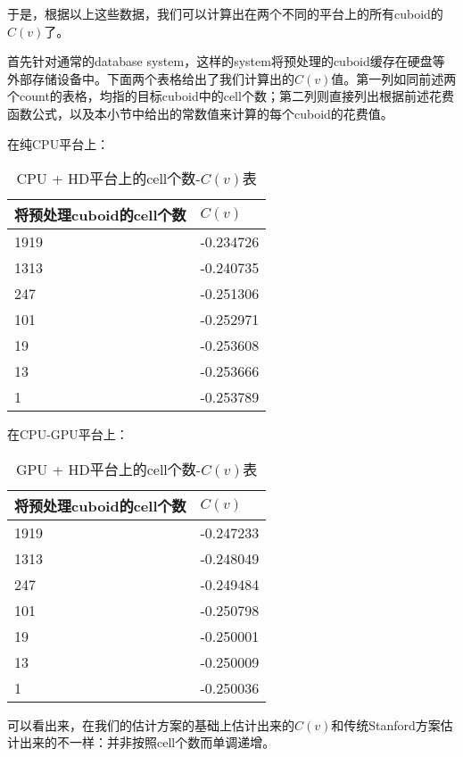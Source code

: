 于是，根据以上这些数据，我们可以计算出在两个不同的平台上的所有cuboid的$C(v)$了。

首先针对通常的database system，这样的system将预处理的cuboid缓存在硬盘等外部存储设备中。下面两个表格给出了我们计算出的$C(v)$值。第一列如同前述两个count的表格，均指的目标cuboid中的cell个数；第二列则直接列出根据前述花费函数公式，以及本小节中给出的常数值来计算的每个cuboid的花费值。

在纯CPU平台上：

\begin{table}[!htbp]
\centering
\caption{CPU + HD平台上的cell个数-$C(v)$表} 
\label{tab:table13}
\begin{tabular}{|l|l|}
    \hline
    将预处理cuboid的cell个数 & $C(v)$\\
    \hline
    1919 & -0.234726\\
    \hline
    1313 & -0.240735\\
    \hline
    247 & -0.251306\\
    \hline
    101 & -0.252971\\
    \hline
    19 & -0.253608\\
    \hline
    13 & -0.253666\\
    \hline
    1 & -0.253789\\
    \hline
\end{tabular}
\end{table}

在CPU-GPU平台上：

\begin{table}[!htbp]
\centering
\caption{GPU + HD平台上的cell个数-$C(v)$表} 
\label{tab:table14}
\begin{tabular}{|l|l|}
    \hline
    将预处理cuboid的cell个数 & $C(v)$\\
    \hline
    1919 & -0.247233\\
    \hline
    1313 & -0.248049\\
    \hline
    247 & -0.249484\\
    \hline
    101 & -0.250798\\
    \hline
    19 & -0.250001\\
    \hline
    13 & -0.250009\\
    \hline
    1 & -0.250036\\
    \hline
\end{tabular}
\end{table}

可以看出来，在我们的估计方案的基础上估计出来的$C(v)$和传统Stanford方案估计出来的不一样：并非按照cell个数而单调递增。

